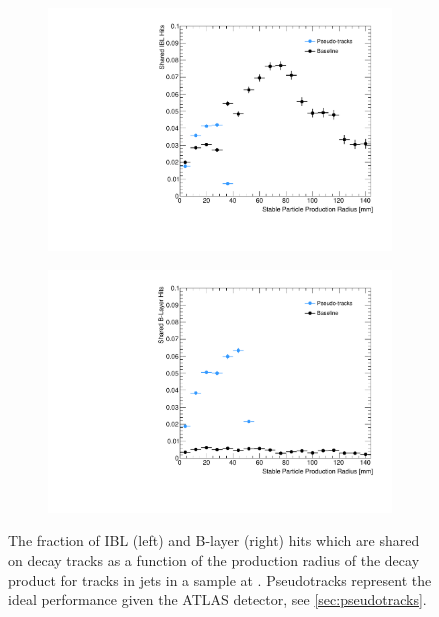 \begin{figure}[!htbp]
    \centering
    \begin{subfigure}{.48\textwidth}
      \centering
      \includegraphics[width=\textwidth]{chapters/3.tracking/figs/po_nSharedOnIBL_From_B_DL.pdf}
    \end{subfigure}%
    \begin{subfigure}{.48\textwidth}
      \centering
      \includegraphics[width=\textwidth]{chapters/3.tracking/figs/po_nSharedOnBL_From_B_DL.pdf}
    \end{subfigure}
    \caption{
      The fraction of IBL (left) and B-layer (right) hits which are shared on \bhadron decay tracks as a function of the production radius of the \bhadron decay product for tracks in jets in a \Zprime sample at . 
      Pseudotracks represent the ideal performance given the ATLAS detector, see \cref{sec:pseudotracks}.
    }
    \label{fig:shared_hits_pseudo}
\end{figure}



